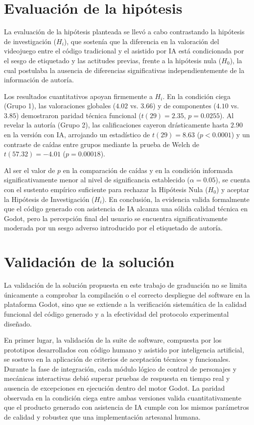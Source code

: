 \section{Evaluación de la hipótesis}

La evaluación de la hipótesis planteada se llevó a cabo contrastando la hipótesis de investigación ($H_i$), que sostenía que la diferencia en la valoración del videojuego entre el código tradicional y el asistido por IA está condicionada por el sesgo de etiquetado y las actitudes previas, frente a la hipótesis nula ($H_0$), la cual postulaba la ausencia de diferencias significativas independientemente de la información de autoría.

Los resultados cuantitativos apoyan firmemente a $H_i$. En la condición ciega (Grupo 1), las valoraciones globales ($4.02$ vs. $3.66$) y de componentes ($4.10$ vs. $3.85$) demostraron paridad técnica funcional ($t(29) = 2.35$, $p = 0.0255$). Al revelar la autoría (Grupo 2), las calificaciones cayeron drásticamente hasta $2.90$ en la versión con IA, arrojando un estadístico de $t(29) = 8.63$ ($p < 0.0001$) y un contraste de caídas entre grupos mediante la prueba de Welch de $t(57.32) = -4.01$ ($p = 0.00018$).

Al ser el valor de $p$ en la comparación de caídas y en la condición informada significativamente menor al nivel de significancia establecido ($\alpha = 0.05$), se cuenta con el sustento empírico suficiente para rechazar la Hipótesis Nula ($H_0$) y aceptar la Hipótesis de Investigación ($H_i$). En conclusión, la evidencia valida formalmente que el código generado con asistencia de IA alcanza una sólida calidad técnica en Godot, pero la percepción final del usuario se encuentra significativamente moderada por un sesgo adverso introducido por el etiquetado de autoría.

\section{Validación de la solución}

La validación de la solución propuesta en este trabajo de graduación no se limita únicamente a comprobar la compilación o el correcto despliegue del software en la plataforma Godot, sino que se extiende a la verificación sistemática de la calidad funcional del código generado y a la efectividad del protocolo experimental diseñado.

En primer lugar, la validación de la suite de software, compuesta por los prototipos desarrollados con código humano y asistido por inteligencia artificial, se sostuvo en la aplicación de criterios de aceptación técnicos y funcionales. Durante la fase de integración, cada módulo lógico de control de personajes y mecánicas interactivas debió superar pruebas de respuesta en tiempo real y ausencia de excepciones en ejecución dentro del motor Godot. La paridad observada en la condición ciega entre ambas versiones valida cuantitativamente que el producto generado con asistencia de IA cumple con los mismos parámetros de calidad y robustez que una implementación artesanal humana.

